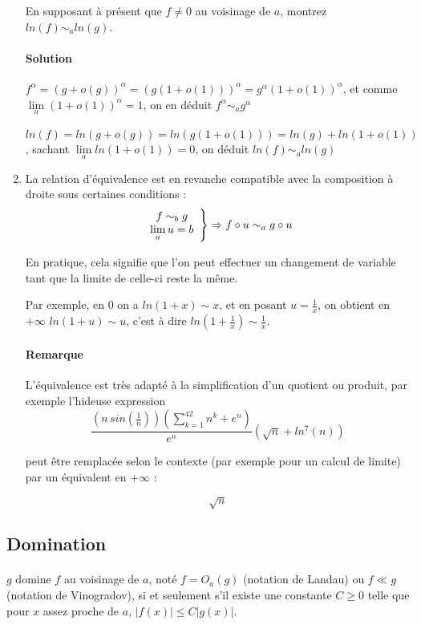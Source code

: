 \documentclass[]{article}
\begin{document}
\begin{enumerate}
	En supposant à présent que $f \ne 0$ au voisinage de $a$, montrez $ln(f) \sim_a ln(g)$.
	
	\paragraph{Solution}
	$f^\alpha = (g+o(g))^\alpha = (g(1+o(1)))^\alpha=g^\alpha (1+o(1))^\alpha$, et comme $\lim\limits_{a} (1+o(1))^\alpha = 1$, on en déduit $f^\alpha \sim_a g^\alpha$
	
	$ln(f)=ln(g+o(g))=ln(g(1+o(1)))=ln(g)+ln(1+o(1))$, sachant $\lim\limits_{a} ln(1+o(1))=0$, on déduit $ln(f) \sim_a ln(g)$
	
	\item La relation d'équivalence est en revanche compatible avec la composition à droite sous certaines conditions :
		$$\left. \begin{array}{c c}
				f \sim_b g \\
				\lim\limits_{a} u=b\\
			\end{array} \right\} \Rightarrow f \circ u \sim_a g \circ u$$
	
	En pratique, cela signifie que l'on peut effectuer un changement de variable tant que la limite de celle-ci reste la même.
	
	Par exemple, en $0$ on a $ln(1+x) \sim x$, et en posant $u=\frac{1}{x}$, on obtient en $+\infty$ $ln(1+u)\sim u$, c'est à dire $ln\left(1+\frac{1}{x}\right) \sim \frac{1}{x}$.
	
	\paragraph{Remarque}
	L'équivalence est très adapté à la simplification d'un quotient ou produit, par exemple l'hideuse expression
	$$\frac{\left(n \, sin \left(\frac{1}{n}\right)\right)\left(\displaystyle \sum_{k=1}^{42} n^k + e^n\right)}{e^{n}} \left(\sqrt{n} + ln^7(n)\right)$$
	
	peut être remplacée selon le contexte (par exemple pour un calcul de limite) par un équivalent en $+\infty$ :
	
	$$\sqrt{n}$$
\end{enumerate}

\subsection{Domination}

\paragraph[Définition]{}
$g$ domine $f$ au voisinage de $a$, noté $f=O_a(g)$ (notation de Landau) ou $f \ll g$ (notation de Vinogradov), si et seulement s'il existe une constante $C \geqslant 0$ telle que pour $x$ assez proche de $a$, $|f(x)| \leqslant C|g(x)|$.
\end{document}
